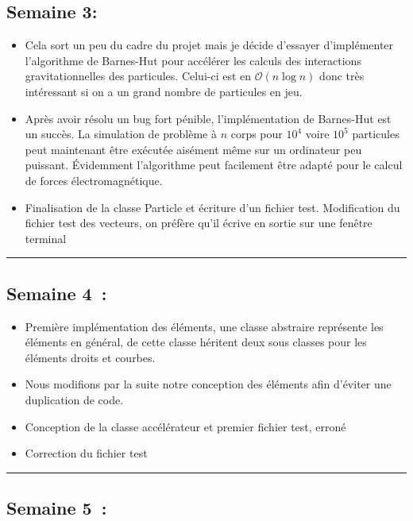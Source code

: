 \documentclass[12pt, letterpaper, twoside]{article}
\begin{document}
\subsection{Semaine 3:}
\begin{itemize}
\item Cela sort un peu du cadre du projet mais je décide d'essayer d'implémenter l'algorithme de Barnes-Hut pour accélérer les calculs des interactions gravitationnelles des particules. Celui-ci est en  $\mathcal{O}(n\log{}n)$ donc très intéressant si on a un grand nombre de particules en jeu.

\item Après avoir résolu un bug fort pénible, l'implémentation de Barnes-Hut est un succès. La simulation de problème à $n$ corps pour $10^4$ voire $10^5$ particules peut maintenant être exécutée aisément même sur un ordinateur peu puissant. Évidemment l'algorithme peut facilement être adapté pour le calcul de forces électromagnétique.

\item Finalisation de la classe Particle et écriture d'un fichier test. Modification du fichier test des vecteurs, on préfère qu'il écrive en sortie sur une fenêtre terminal
\end{itemize}

\rule{\textwidth}{0.4pt}

\subsection{Semaine 4 :}

\begin{itemize}
\item Première implémentation des éléments, une classe abstraire représente les éléments en général, de cette classe héritent deux sous classes pour les éléments droits et courbes.

\item Nous modifions par la suite notre conception des éléments afin d'éviter une duplication de code. 

\item Conception de la classe accélérateur et premier fichier test, erroné

\item Correction du fichier test
\end{itemize}

\rule{\textwidth}{0.4pt}

\subsection{Semaine 5 :}
\end{document}
